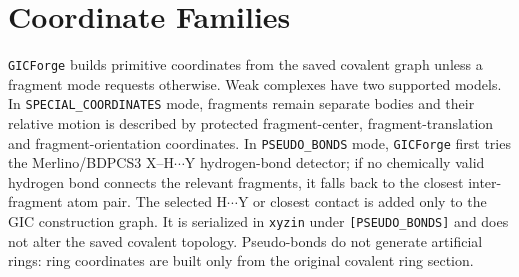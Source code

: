 \documentclass[11pt]{article}
\newcommand{\program}{\texttt{GICForge}}
\newcommand{\xyzin}{\texttt{xyzin}}
\begin{document}
\section{Coordinate Families}

\program{} builds primitive coordinates from the saved covalent graph unless a
fragment mode requests otherwise.  Weak complexes have two supported models.
In \texttt{SPECIAL\_COORDINATES} mode, fragments remain separate bodies and
their relative motion is described by protected fragment-center,
fragment-translation and fragment-orientation coordinates.  In
\texttt{PSEUDO\_BONDS} mode, \program{} first tries the Merlino/BDPCS3
X--H\(\cdots\)Y hydrogen-bond detector; if no chemically valid hydrogen bond
connects the relevant fragments, it falls back to the closest inter-fragment
atom pair.  The selected H\(\cdots\)Y or closest contact is added only to the
GIC construction graph.  It is serialized in \xyzin{} under
\texttt{[PSEUDO\_BONDS]} and does not alter the saved covalent topology.
Pseudo-bonds do not generate artificial rings: ring coordinates are built only
from the original covalent ring section.
\end{document}
